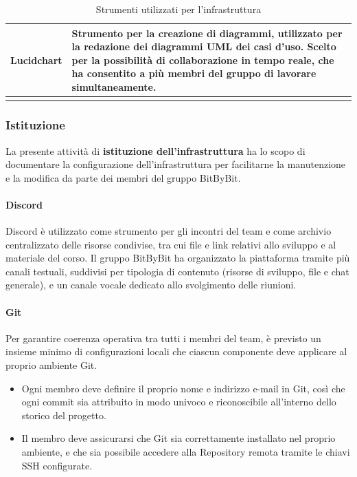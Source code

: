 \documentclass[a4paper,12pt]{article}
\begin{document}
\begin{center}
\begin{longtable}{| m{3cm} | m{} |}
\hline
\rowcolor{white}
\centering Lucidchart & Strumento per la creazione di diagrammi, utilizzato per la redazione dei diagrammi UML dei casi d’uso. Scelto per la possibilità di collaborazione in tempo reale, che ha consentito a più membri del gruppo di lavorare simultaneamente.\\
\hline
\caption{Strumenti utilizzati per l'infrastruttura} \\
\end{longtable}
\end{center}

\subsubsection{Istituzione} \label{par:p-infrastruttura-istituzione}
La presente attività di \textbf{istituzione dell'infrastruttura} ha lo scopo di documentare la configurazione dell'infrastruttura per facilitarne la manutenzione e la modifica da parte dei membri del gruppo BitByBit.

\paragraph{Discord}
Discord è utilizzato come strumento per gli incontri del team e come archivio centralizzato delle risorse condivise, tra cui file e link relativi allo sviluppo e al materiale del corso.  
Il gruppo BitByBit ha organizzato la piattaforma tramite più canali testuali, suddivisi per tipologia di contenuto (risorse di sviluppo, file e chat generale), e un canale vocale dedicato allo svolgimento delle riunioni.

\paragraph{Git}
Per garantire coerenza operativa tra tutti i membri del team, è previsto un insieme minimo di configurazioni locali che ciascun componente deve applicare al proprio ambiente Git.
\begin{itemize}
    \item Ogni membro deve definire il proprio nome e indirizzo e-mail in Git, così che ogni commit sia attribuito in modo univoco e riconoscibile all’interno dello storico del progetto.
    \item Il membro deve assicurarsi che Git sia correttamente installato nel proprio ambiente, e che sia possibile accedere alla Repository remota tramite le chiavi SSH configurate.
\end{itemize}
\end{document}
